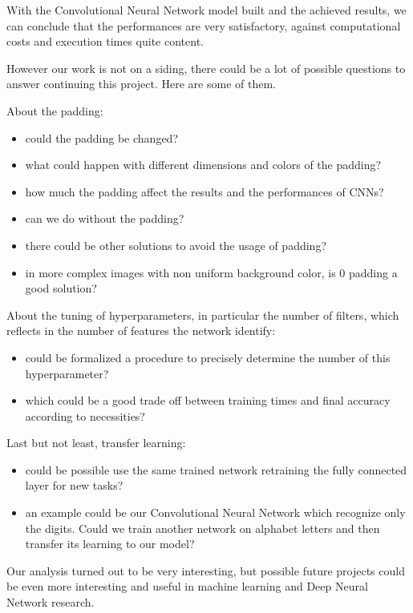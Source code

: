 With the Convolutional Neural Network model built and the achieved results, we can conclude that the performances are very satisfactory, against computational costs and execution times quite content.

However our work is not on a siding, there could be a lot of possible questions to answer continuing this project. Here are some of them.

About the padding:
\begin{itemize}
	\item could the padding be changed?
	\item what could happen with different dimensions and colors of the padding?
	\item how much the padding affect the results and the performances of \acsp{CNN}?
	\item can we do without the padding?
	\item there could be other solutions to avoid the usage of padding?
	\item in more complex images with non uniform background color, is 0 padding a good solution? 
\end{itemize}

About the tuning of hyperparameters, in particular the number of filters, which reflects in the number of features the network identify:
\begin{itemize}
	\item could be formalized a procedure to precisely determine the number of this hyperparameter?
	\item which could be a good trade off between training times and final accuracy according to necessities?
\end{itemize}

Last but not least, transfer learning:
\begin{itemize}
	\item could be possible use the same trained network retraining the fully connected layer for new tasks?
	\item an example could be our Convolutional Neural Network which recognize only the digits. Could we train another network on alphabet letters and then transfer its learning to our model?
\end{itemize}

Our analysis turned out to be very interesting, but possible future projects could be even more interesting and useful in machine learning and Deep Neural Network research.